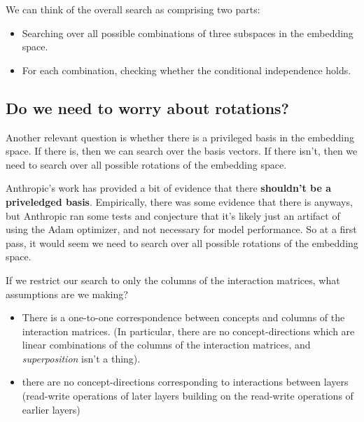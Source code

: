 \documentclass{article}
\begin{document}

We can think of the overall search as comprising two parts:
\begin{itemize}
    \item Searching over all possible combinations of three subspaces in the embedding space. 
    \item For each combination, checking whether the conditional independence holds. 
\end{itemize}

\subsection{Do we need to worry about rotations?}

Another relevant question is whether there is a privileged basis in the embedding space. If there is, then we can search over the basis vectors. If there isn't, then we need to search over all possible rotations of the embedding space.

Anthropic's work has provided a bit of evidence that there \textbf{shouldn't be a priveledged basis}. Empirically, there was some evidence that there is anyways, but Anthropic ran some tests and conjecture that it's likely just an artifact of using the Adam optimizer, and not necessary for model performance. So at a first pass, it would seem we need to search over all possible rotations of the embedding space.

If we restrict our search to only the columns of the interaction matrices, what assumptions are we making?
\begin{itemize}
    \item There is a one-to-one correspondence between concepts and columns of the interaction matrices. (In particular, there are no concept-directions which are linear combinations of the columns of the interaction matrices, and \emph{superposition} isn't a thing).
    \item there are no concept-directions corresponding to interactions between layers (read-write operations of later layers building on the read-write operations of earlier layers)
\end{itemize}
\end{document}

